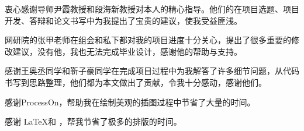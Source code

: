\begin{acknowledgement}
  衷心感谢导师尹霞教授和段海新教授对本人的精心指导。他们的在项目选题、项目开发、答辩和论文书写中为我提出了宝贵的建议，使我受益匪浅。

  网研院的张甲老师在组会和私下都对我的项目进度十分关心，提出了很多重要的修改建议，没有他，我也无法完成毕业设计，感谢他的帮助与支持。

  感谢王奥丞同学和靳子豪同学在完成项目过程中为我解答了许多细节问题，从代码书写到思路整理，他们都为本文做出了贡献，令我十分感动，感谢他们。

  感谢ProcessOn，帮助我在绘制美观的插图过程中节省了大量的时间。

  感谢 \LaTeX 和 \thuthesis\cite{thuthesis}，帮我节省了极多的排版的时间。
\end{acknowledgement}
